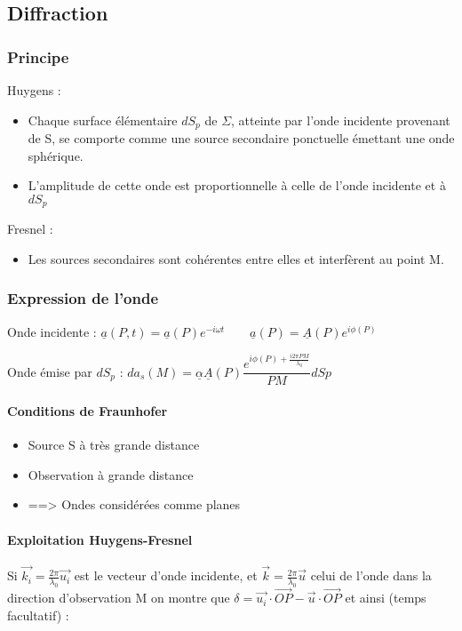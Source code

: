 \documentclass[9pt]{article}
\begin{document}
\begin{multicols*}{2}
\setlength{\columnseprule}{0.1pt}
\part*{Diffraction}
\section{Principe}
\noindent
Huygens :
\begin{itemize}
  \item Chaque surface élémentaire $dS_p$ de $\Sigma$, atteinte par l'onde incidente provenant de S, se comporte comme une source secondaire ponctuelle émettant une onde sphérique.
  \item L'amplitude de cette onde est proportionnelle à celle de l'onde incidente et à $dS_p$
\end{itemize}
Fresnel :
\begin{itemize}
  \item Les sources secondaires sont cohérentes entre elles et interfèrent au point M.
\end{itemize}

\section{Expression de l'onde}
Onde incidente :
$\underline{a}(P,t) = \underline{a}(P) e^{-i\omega t} \qquad \underline{a}(P) = \underline{A} (P) e^{i\phi (P)}$

Onde émise par $dS_p$ : $da_s(M) = \underline{\alpha} \underline{A} (P) \dfrac{e^{i \phi (P) + \frac{i2\pi PM}{\lambda_0} }}{PM} dSp$

\subsection{Conditions de Fraunhofer}
\begin{itemize}
  \item Source S à très grande distance
  \item Observation à grande distance
  \item ==> Ondes considérées comme planes
\end{itemize}

\subsection{Exploitation Huygens-Fresnel}
Si $\overrightarrow{k_i} = \frac{2\pi}{\lambda_0} \overrightarrow{u_i} $ est le vecteur d'onde incidente, et $\overrightarrow{k} = \frac{2\pi}{\lambda_0} \overrightarrow{u} $ celui de l'onde dans la direction d'observation M on montre que $\delta = \overrightarrow{u_i} \cdot \overrightarrow{OP} - \overrightarrow{u} \cdot \overrightarrow{OP} $ et ainsi (temps facultatif) :


\end{multicols*}
\end{document}
